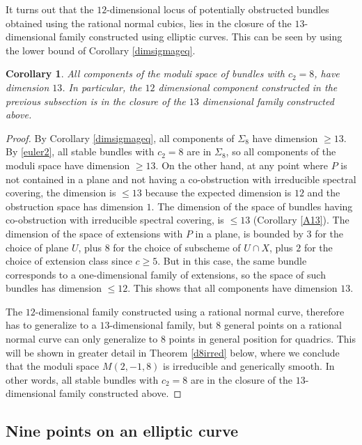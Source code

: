\documentclass{amsart}
\theoremstyle{plain}
\newtheorem{corollary}[theorem]{Corollary}
\numberwithin{equation}{section}
\begin{document}
It turns out that the $12$-dimensional locus of potentially obstructed
bundles obtained using the rational normal cubics, lies in the closure of the $13$-dimensional
family  constructed using elliptic curves. This can be seen by using the 
lower bound of Corollary \ref{dimsigmageq}.

\begin{corollary}
\label{geq13}
All components of the moduli space of bundles with $c_2=8$, have dimension $13$.
In particular, the $12$ dimensional component constructed in the previous subsection
is in the closure of the $13$ dimensional family constructed above. 
\end{corollary}
\begin{proof}
By Corollary \ref{dimsigmageq}, all components of $\Sigma _8$ have dimension $\geq 13$.
By \eqref{euler2}, all stable bundles with $c_2=8$ are in $\Sigma _8$, so all components of
the moduli space have dimension $\geq 13$. On the other hand, at any point 
where $P$ is not contained in a plane and not having a co-obstruction with
irreducible spectral covering, the dimension is $\leq 13$ because the expected
dimension is $12$ and the obstruction space has dimension $1$. 
The dimension of the space of bundles having co-obstruction with irreducible spectral
covering, is $\leq 13$ (Corollary \ref{A13}). 
The dimension of the space of extensions with $P$ 
in a plane, is bounded by $3$ for the choice of plane $U$, plus $8$ for the
choice of subscheme of $U\cap X$, plus $2$ for the choice of extension class since $c\geq 5$.
But in this case, the same bundle corresponds to a one-dimensional family of extensions, so
the space of such bundles has dimension $\leq 12$. This shows that all components have dimension $13$. 

The $12$-dimensional family constructed using a rational normal curve, therefore has
to generalize to a $13$-dimensional family, but $8$ general points on a rational normal curve can only generalize to $8$ points in general position for quadrics. 
This will be  shown in greater detail in Theorem \ref{d8irred} below, where we conclude that
the moduli space $M (2,-1,8)$ is irreducible and generically smooth. 
In other words, all stable bundles 
with $c_2=8$ are in the closure of the $13$-dimensional
family constructed above.
\end{proof}

\subsection{Nine points on an elliptic curve}
\end{document}
